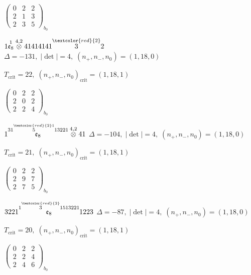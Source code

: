 \documentclass[10pt]{article}
\begin{document}
\hspace{2em}$\left(\begin{smallmatrix}0 & 2 & 2 \\ 2 & 1 & 3 \\ 2 & 3 & 5\end{smallmatrix}\right)_{\!b_0}$

\smallskip

$1\overset{1}{\mathfrak{e}_8}\overset{4,2}{\otimes}41414141\overset{\textcolor{red}{2}}{3}2$ \quad $\Delta=-131,\; |\det|=4,\; (n_+,n_-,n_0)=(1,18,0)$

\hspace{1em}$T_{\text{crit}}=22,\; (n_+,n_-,n_0)_{\text{crit}}=(1,18,1)$

\hspace{2em}$\left(\begin{smallmatrix}0 & 2 & 2 \\ 2 & 0 & 2 \\ 2 & 2 & 4\end{smallmatrix}\right)_{\!b_0}$

\smallskip

$1\overset{31\overset{\textcolor{red}{2}1}{5}13221}{\mathfrak{e}_8}\overset{4,2}{\otimes}41$ \quad $\Delta=-104,\; |\det|=4,\; (n_+,n_-,n_0)=(1,18,0)$

\hspace{1em}$T_{\text{crit}}=21,\; (n_+,n_-,n_0)_{\text{crit}}=(1,18,1)$

\hspace{2em}$\left(\begin{smallmatrix}0 & 2 & 2 \\ 2 & 9 & 7 \\ 2 & 7 & 5\end{smallmatrix}\right)_{\!b_0}$

\smallskip

$3221\overset{1\overset{\textcolor{red}{2}}{3}1513221}{\mathfrak{e}_8}1223$ \quad $\Delta=-87,\; |\det|=4,\; (n_+,n_-,n_0)=(1,18,0)$

\hspace{1em}$T_{\text{crit}}=20,\; (n_+,n_-,n_0)_{\text{crit}}=(1,18,1)$

\hspace{2em}$\left(\begin{smallmatrix}0 & 2 & 2 \\ 2 & 2 & 4 \\ 2 & 4 & 6\end{smallmatrix}\right)_{\!b_0}$
\end{document}
